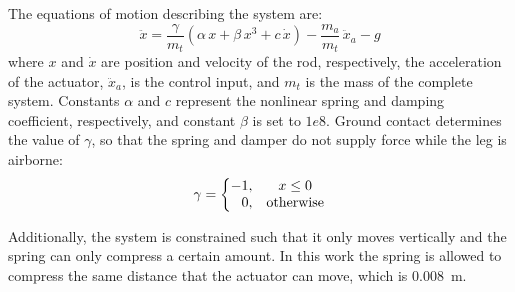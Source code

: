 \documentclass[10pt,twocolumn,letterpaper]{article}
\begin{document}
The equations of motion describing the system are:
%	
\begin{equation}
		\ddot{x} = \frac{\gamma}{m_t} \left(\alpha\,x + \beta\,x^3 + c\,\dot{x}\right)-\frac{m_a}{m_t}\,\ddot{x}_a-g
\end{equation}
%
where $x$ and $\dot{x}$ are position and velocity of the rod, respectively, the acceleration of the actuator, $\ddot{x}_a$, is the control input, and $m_t$ is the mass of the complete system. Constants $\alpha$ and $c$ represent the nonlinear spring and damping coefficient, respectively, and constant $\beta$ is set to $1e8$. Ground contact determines the value of $\gamma$, so that the spring and damper do not supply force while the leg is airborne:
%
	\begin{equation}
		\gamma =
		\left\{\begin{matrix}
		   -1, & x \leq 0\\ 
		   \hphantom{-} 0, & \mbox{otherwise}
		   \end{matrix}\right.
	 \end{equation}
%

Additionally, the system is constrained such that it only moves vertically and the spring can only compress a certain amount. In this work the spring is allowed to compress the same distance that the actuator can move, which is 0.008~m.
\end{document}
